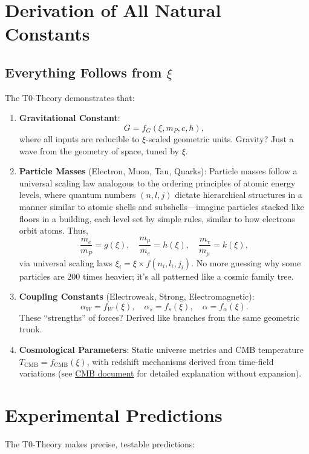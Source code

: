	\section{Derivation of All Natural Constants}
	\subsection{Everything Follows from $\xi$}
	The T0-Theory demonstrates that:
	\begin{enumerate}
		\item \textbf{Gravitational Constant}:
		\[
		G = f_G(\xi, m_P, c, \hbar),
		\]
		where all inputs are reducible to $\xi$-scaled geometric units. Gravity? Just a wave from the geometry of space, tuned by $\xi$.
		
		\item \textbf{Particle Masses} (Electron, Muon, Tau, Quarks):
		Particle masses follow a universal scaling law analogous to the ordering principles of atomic energy levels, where quantum numbers $(n, l, j)$ dictate hierarchical structures in a manner similar to atomic shells and subshells—imagine particles stacked like floors in a building, each level set by simple rules, similar to how electrons orbit atoms. Thus,
		\[
		\frac{m_e}{m_P} = g(\xi), \quad \frac{m_\mu}{m_e} = h(\xi), \quad \frac{m_\tau}{m_\mu} = k(\xi),
		\]
		via universal scaling laws $\xi_i = \xi \times f(n_i, l_i, j_i)$. No more guessing why some particles are 200 times heavier; it's all patterned like a cosmic family tree.
		
		\item \textbf{Coupling Constants} (Electroweak, Strong, Electromagnetic):
		\[
		\alpha_W = f_W(\xi), \quad \alpha_s = f_s(\xi), \quad \alpha = f_\alpha(\xi).
		\]
		These ``strengths'' of forces? Derived like branches from the same geometric trunk.
		
		\item \textbf{Cosmological Parameters}:
		Static universe metrics and CMB temperature $T_{\text{CMB}} = f_{\text{CMB}}(\xi)$, with redshift mechanisms derived from time-field variations (see \href{https://github.com/jpascher/T0-Time-Mass-Duality/blob/main/2/pdf/140_T0_CMB_Donoghue_Analyse_En.pdf}{CMB document} for detailed explanation without expansion).
	\end{enumerate}
	
	\section{Experimental Predictions}
	The T0-Theory makes precise, testable predictions:
	

